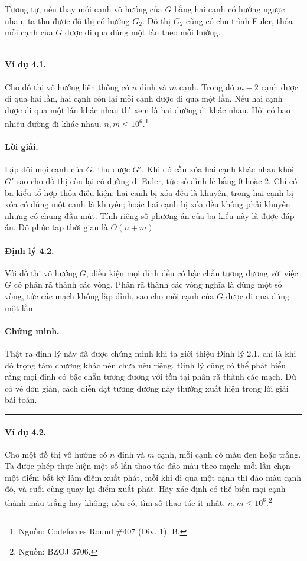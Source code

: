 \documentclass[11pt]{article}
\newcommand{\qedmark}{\hfill\rule{0.7ex}{0.7ex}}
\begin{document}
Tương tự, nếu thay mỗi cạnh vô hướng của \(G\) bằng hai cạnh có hướng ngược
nhau, ta thu được đồ thị có hướng \(G_2\). Đồ thị \(G_2\) cũng có chu trình
Euler, thỏa mỗi cạnh của \(G\) được đi qua đúng một lần theo mỗi hướng.
\qedmark

\paragraph{Ví dụ 4.1.}
Cho đồ thị vô hướng liên thông có \(n\) đỉnh và \(m\) cạnh. Trong đó \(m-2\)
cạnh được đi qua hai lần, hai cạnh còn lại mỗi cạnh được đi qua một lần. Nếu
hai cạnh được đi qua một lần khác nhau thì xem là hai đường đi khác nhau. Hỏi
có bao nhiêu đường đi khác nhau. \(n,m\le 10^6\).\footnote{Nguồn: Codeforces
Round \#407 (Div. 1), B.}

\paragraph{Lời giải.}
Lặp đôi mọi cạnh của \(G\), thu được \(G'\). Khi đó cần xóa hai cạnh khác nhau
khỏi \(G'\) sao cho đồ thị còn lại có đường đi Euler, tức số đỉnh lẻ bằng \(0\)
hoặc \(2\). Chỉ có ba kiểu tổ hợp thỏa điều kiện: hai cạnh bị xóa đều là
khuyên; trong hai cạnh bị xóa có đúng một cạnh là khuyên; hoặc hai cạnh bị xóa
đều không phải khuyên nhưng có chung đầu mút. Tính riêng số phương án của ba
kiểu này là được đáp án. Độ phức tạp thời gian là \(O(n+m)\).

\paragraph{Định lý 4.2.}
Với đồ thị vô hướng \(G\), điều kiện mọi đỉnh đều có bậc chẵn tương đương với
việc \(G\) có phân rã thành các vòng. Phân rã thành các vòng nghĩa là dùng một
số vòng, tức các mạch không lặp đỉnh, sao cho mỗi cạnh của \(G\) được đi qua
đúng một lần.

\paragraph{Chứng minh.}
Thật ra định lý này đã được chứng minh khi ta giới thiệu Định lý 2.1, chỉ là
khi đó trọng tâm chương khác nên chưa nêu riêng. Định lý cũng có thể phát biểu
rằng mọi đỉnh có bậc chẵn tương đương với tồn tại phân rã thành các mạch. Dù có
vẻ đơn giản, cách diễn đạt tương đương này thường xuất hiện trong lời giải bài
toán. \qedmark

\paragraph{Ví dụ 4.2.}
Cho một đồ thị vô hướng có \(n\) đỉnh và \(m\) cạnh, mỗi cạnh có màu đen hoặc
trắng. Ta được phép thực hiện một số lần thao tác đảo màu theo mạch: mỗi lần
chọn một điểm bất kỳ làm điểm xuất phát, mỗi khi đi qua một cạnh thì đảo màu
cạnh đó, và cuối cùng quay lại điểm xuất phát. Hãy xác định có thể biến mọi
cạnh thành màu trắng hay không; nếu có, tìm số thao tác ít nhất.
\(n,m\le 10^6\).\footnote{Nguồn: BZOJ 3706.}
\end{document}
